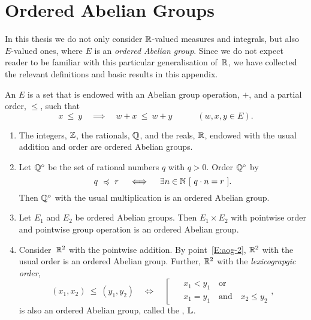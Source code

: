 \documentclass[main.tex]{subfiles}
\begin{document}
\section{Ordered Abelian Groups}
\label{S:ag}
\noindent
In this thesis
we do not only consider $\mathbb{R}$-valued measures and integrals,
but also~$E$-valued ones, 
where $E$ is an \emph{ordered Abelian group}.
Since we do not expect reader to be familiar with this
particular generalisation of~$\mathbb{R}$,
we have collected the relevant definitions
and basic results in this appendix.
\begin{dfn}
\label{D:oag}
An  $E$
is a set that is endowed with an Abelian group operation, $+$,
and a partial order, $\leq$, 
such that 
\begin{equation*}
x \ \leq\ y \quad\implies\quad w+x \ \leq\ w+y
\qquad\quad(w,x,y\in E).
\end{equation*}
\end{dfn}
%
%
\begin{exs}
\label{E:oag}
\begin{enumerate}
\item
\label{E:aog-1}
The integers, $\mathbb{Z}$, the rationals, $\mathbb{Q}$, and the reals, $\mathbb{R}$,
endowed with  the usual addition and order
are ordered Abelian groups.

\item
\label{E:oag_div}
Let
$\mathbb{Q}^{\circ}$
be the set of rational numbers $q$ with $q>0$.
Order $\mathbb{Q}^\circ$ by
\begin{equation*}
q \ \preccurlyeq \ r
\quad\iff\quad 
\exists n\in \mathbb{N} \ [\ q \cdot n = r \ ].
\end{equation*}
Then $\mathbb{Q}^\circ$ with 
the usual multiplication is an  ordered Abelian group.

\item
\label{E:aog-2}
Let $E_1$ and $E_2$ be ordered Abelian groups.
Then $E_1\times E_2$ with pointwise order
and pointwise group operation is an ordered Abelian group.

\item
\label{E:oag_lex}
Consider~$\mathbb{R}^2$ with the pointwise addition.
By point~\ref{E:aog-2},
$\mathbb{R}^2$ with the usual order
is an  ordered Abelian group.
Further,
$\mathbb{R}^2$ with the
 \emph{lexicograpgic order},
\begin{equation*}
(x_1,x_2)\ \leq\ (y_1,y_2)
\quad\iff\quad
\left[ \ \ 
\begin{alignedat}{3}
&x_1 < y_1 \quad\text{or}\\
&x_1 = y_1  \quad\text{and}\quad  x_2 \leq y_2 
\end{alignedat}
\right.,
\end{equation*}
is also an ordered Abelian group,
called the ,
 $\mathbb{L}$.
\end{enumerate}
\end{exs}
\end{document}
